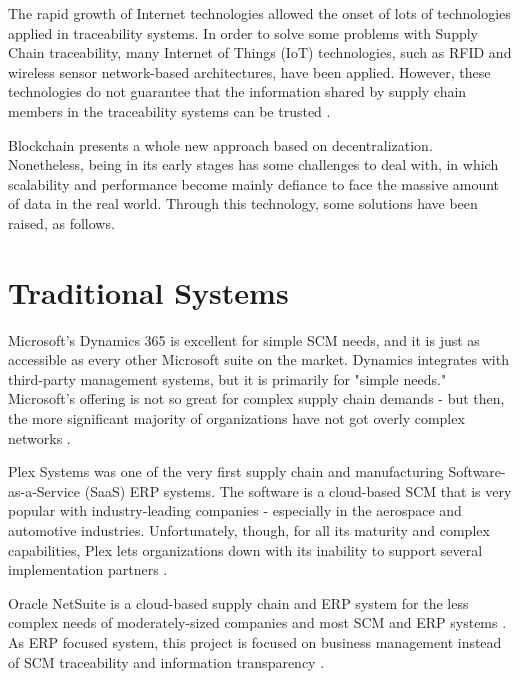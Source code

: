 \label{chap:RelatedWork}

\acresetall 

The rapid growth of Internet technologies allowed the onset of lots of technologies applied in traceability systems. In order to solve some problems with Supply Chain traceability, many Internet of Things (IoT) technologies, such as RFID and wireless sensor network-based architectures, have been applied. However, these technologies do not guarantee that the information shared by supply chain members in the traceability systems can be trusted \cite{tian2017supply}.

Blockchain presents a whole new approach based on decentralization. Nonetheless, being in its early stages has some challenges to deal with, in which scalability and performance become mainly defiance to face the massive amount of data in the real world. Through this technology, some solutions have been raised, as follows.

\section{Traditional Systems} \label{sec:TraditionalSystems}

Microsoft's Dynamics 365 is excellent for simple SCM needs, and it is just as accessible as every other Microsoft suite on the market. Dynamics integrates with third-party management systems, but it is primarily for "simple needs." Microsoft's offering is not so great for complex supply chain demands - but then, the  more significant majority of organizations have not got overly complex networks \cite{bellu2018microsoft}.

Plex Systems was one of the very first supply chain and manufacturing Software-as-a-Service (SaaS) ERP systems. The software is a cloud-based SCM that is very popular with industry-leading companies - especially in the aerospace and automotive industries. Unfortunately, though, for all its maturity and complex capabilities, Plex lets organizations down with its inability to support several implementation partners \cite{plex}.

Oracle NetSuite is a cloud-based supply chain and ERP system for the less complex needs of moderately-sized companies and most SCM and ERP systems \cite{rolling2016using}. As ERP focused system, this project is focused on business management instead of SCM traceability and information transparency \cite{rolling2016using}.

